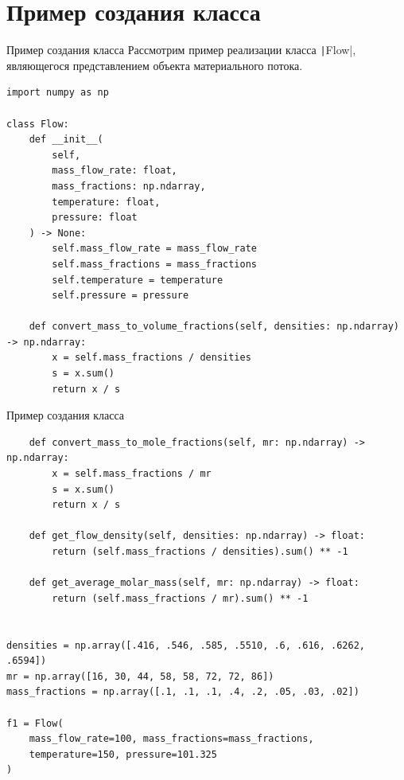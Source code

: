 \documentclass[aspectratio=169, mathserif]{beamer}	%
\begin{document}
\section{Пример создания класса}
\sectionframe

\begin{frame}[fragile]{Пример создания класса}
\scriptsize
Рассмотрим пример реализации класса \texttt|Flow|, являющегося представлением объекта материального потока.
\vfill
\begin{verbatim}
import numpy as np

class Flow:
    def __init__(
        self,
        mass_flow_rate: float,
        mass_fractions: np.ndarray,
        temperature: float,
        pressure: float
    ) -> None:
        self.mass_flow_rate = mass_flow_rate
        self.mass_fractions = mass_fractions
        self.temperature = temperature
        self.pressure = pressure

    def convert_mass_to_volume_fractions(self, densities: np.ndarray) -> np.ndarray:
        x = self.mass_fractions / densities
        s = x.sum()
        return x / s
\end{verbatim}
\vfill
\end{frame}

\begin{frame}[fragile]{Пример создания класса}
\scriptsize
\begin{verbatim}
    def convert_mass_to_mole_fractions(self, mr: np.ndarray) -> np.ndarray:
        x = self.mass_fractions / mr
        s = x.sum()
        return x / s

    def get_flow_density(self, densities: np.ndarray) -> float:
        return (self.mass_fractions / densities).sum() ** -1

    def get_average_molar_mass(self, mr: np.ndarray) -> float:
        return (self.mass_fractions / mr).sum() ** -1


densities = np.array([.416, .546, .585, .5510, .6, .616, .6262, .6594])
mr = np.array([16, 30, 44, 58, 58, 72, 72, 86])
mass_fractions = np.array([.1, .1, .1, .4, .2, .05, .03, .02])

f1 = Flow(
    mass_flow_rate=100, mass_fractions=mass_fractions,
    temperature=150, pressure=101.325
)
\end{verbatim}
\vfill
\end{frame}
\end{document}
